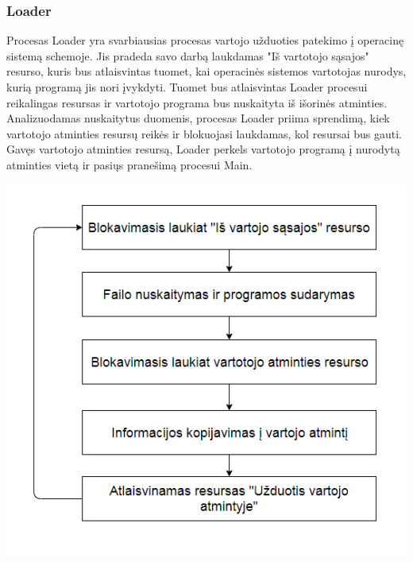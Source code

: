 \documentclass{scrartcl}
\begin{document}
      \subsubsection{Loader}
        Procesas Loader yra svarbiausias procesas vartojo užduoties patekimo į operacinę sistemą schemoje. Jis pradeda savo darbą laukdamas "Iš vartotojo sąsajos" resurso, kuris bus atlaisvintas tuomet, kai operacinės sistemos vartotojas nurodys, kurią programą jis nori įvykdyti. Tuomet bus atlaisvintas Loader procesui reikalingas resursas ir vartotojo programa bus nuskaityta iš išorinės atminties. Analizuodamas nuskaitytus duomenis, procesas Loader priima sprendimą, kiek vartotojo atminties resursų reikės ir blokuojasi laukdamas, kol resursai bus gauti. Gavęs vartotojo atminties resursą, Loader perkels vartotojo programą į nurodytą atminties vietą ir pasiųs pranešimą procesui Main.
        \begin{center}
          \includegraphics[scale=1]{Loader}
        \end{center}
\end{document}
